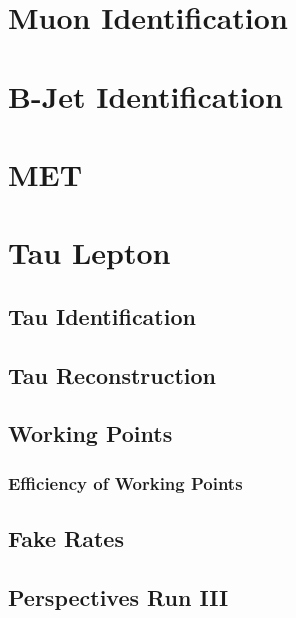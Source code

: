 \section{Muon Identification}
\label{sec:Muon}

\section{B-Jet Identification}
\label{sec:BJet}

\section{MET}
\label{sec:MET}

\section{Tau Lepton}
\label{sec:Tau}

\subsection{Tau Identification}
\label{subsec:TauTrigger}

\subsection{Tau Reconstruction}
\label{subsec:TauReconstruction}

\subsection{Working Points}
\label{subsec:wp}

\subsubsection{Efficiency of Working Points}
\label{subsubsec:Eff_WP}

\subsection{Fake Rates}
\label{subsec:FakeRates}

\subsection{Perspectives Run III}
\label{subsec:Perspectives}